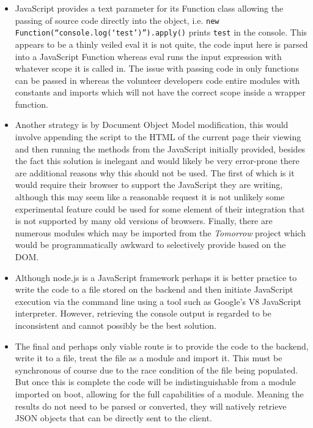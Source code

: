 \documentclass[jou,apacite]{apa6}
\begin{document}
\begin{itemize}
  		\setlength\itemsep{-0.2em}
		\item JavaScript provides a text parameter for its Function class allowing the passing of source code directly into the object, i.e. \texttt{new Function(“console.log(‘test’)”).apply()} prints \texttt{test} in the console. This appears to be a thinly veiled eval it is not quite, the code input here is parsed into a JavaScript Function whereas eval runs the input expression with whatever scope it is called in. The issue with passing code in only functions can be passed in whereas the volunteer developers code entire modules with constants and imports which will not have the correct scope inside a wrapper function.
		\item Another strategy is by Document Object Model modification, this would involve appending the script to the HTML of the current page their viewing and then running the methods from the JavaScript initially provided, besides the fact this solution is inelegant and would likely be very error-prone there are additional reasons why this should not be used. The first of which is it would require their browser to support the JavaScript they are writing, although this may seem like a reasonable request it is not unlikely some experimental feature could be used for some element of their integration that is not supported by many old versions of browsers. Finally, there are numerous modules which may be imported from the \textit{Tomorrow} project which would be programmatically awkward to selectively provide based on the DOM. 
		\item Although node.js is a JavaScript framework perhaps it is better practice to write the code to a file stored on the backend and then initiate JavaScript execution via the command line using a tool such as Google’s V8 JavaScript interpreter. However, retrieving the console output is regarded to be inconsistent and cannot possibly be the best solution.
		\item The final and perhaps only viable route is to provide the code to the backend, write it to a file, treat the file as a  module and import it. This must be synchronous of course due to the race condition of the file being populated. But once this is complete the code will be indistinguishable from a module imported on boot, allowing for the full capabilities of a module. Meaning the results do not need to be parsed or converted, they will natively retrieve JSON objects that can be directly sent to the client.
		
	\end{itemize}
	
\end{document}
